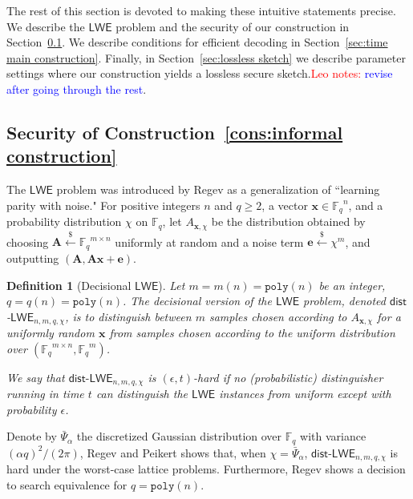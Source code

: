 \documentclass[11pt]{article}
\newcommand{\secref}[1]{\mbox{Section~\ref{#1}}}
\newcommand{\defref}[1]{\mbox{Definition~\ref{#1}}}
\newcommand{\consref}[1]{\mbox{Construction~\ref{#1}}}
\newcommand{\class}[1]{{\ensuremath{\mathsf{#1}}}}
\newcommand{\vect}[1]{\ensuremath{\textbf{#1}}}
\newcommand{\Fq}{\ensuremath{\mathbb{F}_q}}
\newcommand{\poly}{\ensuremath{\mathtt{poly}}\xspace}
\newcommand{\lwe}{\class{LWE}}
\newcommand{\LWE}{\class{LWE}}
\newcommand{\distLWE}{\ensuremath{\class{dist\mbox{-}LWE}}}
\newtheorem{definition}[theorem]{Definition}
\newcommand{\authnote}[2]{{\textcolor{red}{\textsf{#1 notes: }\textcolor{blue}{ #2}}\marginpar{\textcolor{red}{\textbf{!!!!!}}}}}
\newcommand{\authnote}[2]{}
\newcommand{\lnote}[1]{{\authnote{Leo}{#1}}}
\newcommand{\ve}{\vect{e}}
\newcommand{\vA}{\vect{A}}
\newcommand{\vx}{\vect{x}}
\begin{document}
The rest of this section is devoted to making these intuitive statements precise.
 We describe the \class{LWE} problem and the security of our construction in \secref{subsec:LWE}.
We describe conditions for efficient decoding in \secref{sec:time main construction}.  Finally, in \secref{sec:lossless sketch} we describe parameter settings where our construction yields a lossless secure sketch.\lnote{revise after going through the rest}.



\subsection{Security of \consref{cons:informal construction}}
\label{subsec:LWE}
The $\LWE$ problem was introduced by Regev \cite{regev2005LWE, regevLWEsurvey} as a generalization of ``learning parity with noise." For positive integers $n$ and $q \ge 2$, a vector $\vx \in \Fq^n$, and a probability distribution $\chi$ on $\Fq$, let $A_{\vect{x}, \chi}$ be the distribution obtained by choosing $\vA \overset{\$}\leftarrow \Fq^{m\times n}$ uniformly at random and a noise term $\ve \overset{\$}\leftarrow \chi^m$, and outputting $(\vA, \vA\vx+\ve)$. 

\begin{definition}[Decisional $\lwe$]\label{def:dist-LWE}
Let $m = m(n) = \poly(n)$ be an integer, $q = q(n) = \poly(n)$. The decisional version of the $\LWE$ problem, denoted \class{dist}-$\LWE_{n, m, q, \chi}$, is to distinguish between $m$ samples chosen according to $A_{\vx, \chi}$ for a uniformly random $\vx$ from samples chosen according to the uniform distribution over $(\Fq^{m\times n}, \Fq^m)$. 

We say that $\distLWE_{n, m, q, \chi}$ is $(\epsilon, t)$-hard if no (probabilistic) distinguisher running in time $t$ can distinguish the $\lwe$ instances from uniform except with probability $\epsilon$.
\end{definition}

Denote by $\bar{\Psi}_\alpha$ the discretized Gaussian distribution over $\Fq$ with variance $(\alpha q)^2/(2\pi)$, Regev\cite{regev2005LWE} and Peikert \cite{peikert2009latticereduction} shows that, when $\chi = \bar{\Psi}_{\alpha}$, $\class{dist}$-$\lwe_{n, m, q, \chi}$ is hard under the worst-case lattice problems.
Furthermore, Regev \cite{regev2005LWE} shows a decision to search equivalence for $q=\poly(n)$.
\end{document}
